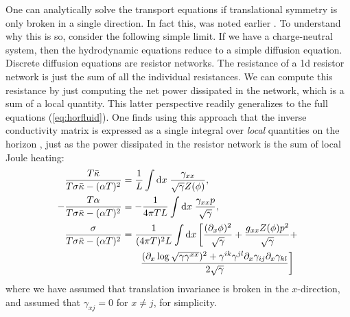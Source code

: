 \documentclass[10pt, oneside]{book}
\begin{document}
\begin{doublespace}
One can analytically solve the transport equations if translational symmetry is only broken in a single direction.   In fact this, was noted earlier \cite{Donos:2014yya, Rangamani:2015hka}.   To understand why this is so, consider the following simple limit.  If we have a charge-neutral system, then the hydrodynamic equations reduce to a simple diffusion equation.   Discrete diffusion equations are resistor networks.   The resistance of a 1d resistor network is just the sum of all the individual resistances.    We can compute this resistance by just computing the net power dissipated in the network, which is a sum of a local quantity.   This latter perspective readily generalizes to the full equations (\ref{eq:horfluid}).   One finds using this approach that the inverse conductivity matrix is expressed as a single integral over \emph{local} quantities on the horizon \cite{Banks:2015wha}, just as the power dissipated in the resistor network is the sum of local Joule heating:    \begin{subequations}\begin{align}
\frac{T\bar\kappa }{T\sigma \bar\kappa- (\alpha T)^2} &= \frac{1}{L} \int \mathrm{d}x \; \frac{\gamma_{xx}}{\sqrt{\gamma} Z(\phi)}, \\
-\frac{T\alpha}{T\sigma \bar\kappa- (\alpha T)^2} &= -\frac{1}{4\pi TL} \int \mathrm{d}x \; \frac{\gamma_{xx} p}{\sqrt{\gamma}}, \\
\frac{\sigma}{T\sigma \bar\kappa- (\alpha T)^2} &= \frac{1}{(4\pi T)^2L}\int \mathrm{d}x \left[\frac{(\partial_x \phi)^2}{\sqrt{\gamma}} + \frac{g_{xx}Z(\phi)p^2}{\sqrt{\gamma}} + \right. \notag \\
&\left.\;\;\;\;\;\; \frac{(\partial_x \log \sqrt{\gamma \gamma ^{xx}})^2 + \gamma^{ik}\gamma^{jl}\partial_x \gamma_{ij}\partial_x \gamma_{kl}}{2\sqrt{\gamma}}\right]
\end{align}\end{subequations}
where we have assumed that translation invariance is broken in the $x$-direction, and assumed that $\gamma_{xj}=0$ for $x\ne j$, for simplicity.


\end{doublespace}
\end{document}
